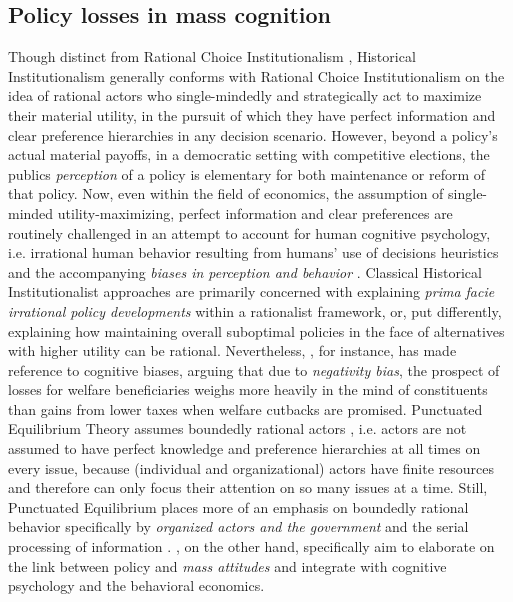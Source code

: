 \documentclass[11pt]{article}
\begin{document}
\subsection*{Policy losses in mass cognition}

Though distinct from Rational Choice Institutionalism \parencite[see e.g.][]{Hall1996}, Historical Institutionalism generally conforms with Rational Choice Institutionalism on the idea of rational actors who single-mindedly and strategically act  to maximize their material utility, in the pursuit of which they have perfect information and clear preference hierarchies in any decision scenario. However, beyond a policy's actual material payoffs, in a democratic setting with competitive elections, the publics \textit{perception} of a policy is elementary for both maintenance or reform of that policy. Now, even within the field of economics, the assumption of single-minded utility-maximizing, perfect information and clear preferences are routinely challenged in an attempt to account for human cognitive psychology, i.e. irrational human behavior resulting from humans' use of decisions heuristics and the accompanying \textit{biases in perception and behavior} \parencite[see e.g.][]{Kahnemann1982}. Classical Historical Institutionalist approaches \parencite[e.g.][]{Pierson2000} are primarily concerned with explaining \textit{prima facie irrational policy developments} within a rationalist framework, or, put differently, explaining how maintaining overall suboptimal policies in the face of alternatives with higher utility can be rational. Nevertheless, \textcite[][]{Pierson1994}, for instance, has made reference to cognitive biases, arguing that due to \textit{negativity bias}, the prospect of losses for welfare beneficiaries weighs more heavily in the mind of constituents than gains from lower taxes when welfare cutbacks are promised. Punctuated Equilibrium Theory assumes boundedly rational actors \parencite[][]{Simon1955}, i.e. actors are not assumed to have perfect knowledge and preference hierarchies at all times on every issue, because (individual and organizational) actors have finite resources and therefore can only focus their attention on so many issues at a time. Still, Punctuated Equilibrium places more of an emphasis on boundedly rational behavior specifically by \textit{organized actors and the government} and the serial processing of information \parencite[see][p. 65]{Baumgartner2018}. \textcite[][]{Jacobs2014}, on the other hand, specifically aim to elaborate on the link between policy and \textit{mass attitudes} and integrate with cognitive psychology and the behavioral economics.
\end{document}
